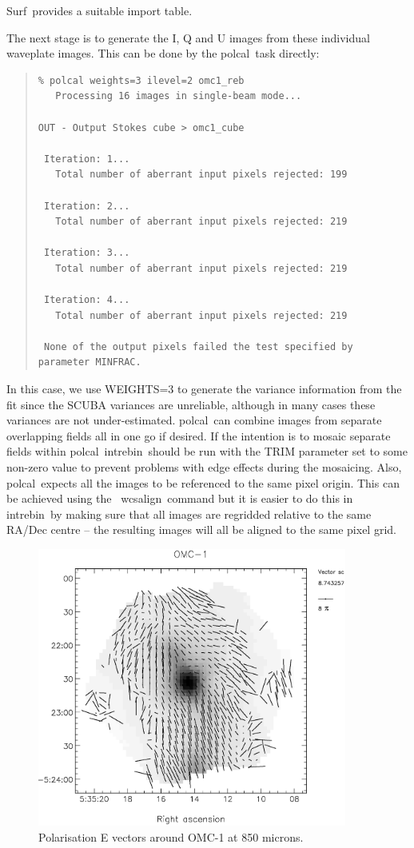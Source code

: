 \documentclass[twoside,11pt]{article}
\newcommand{\scusoft}          {{\sc Surf}}
\newcommand{\Kappa}{\xref{{\sc{Kappa}}}{sun95}{}}
\newcommand{\task}[1]{{\sf #1}}
\newcommand{\intrebin}{\htmlref{\task{intrebin}}{INTREBIN}}
\newcommand{\wcsalign}{\xref{\task{wcsalign}}{sun95}{WCSALIGN}}
\newcommand{\polcal}{\xref{\task{polcal}}{sun223}{POLCAL}}
\newenvironment{myquote}{\begin{quote}\begin{small}}{\end{small}\end{quote}}
\newcommand{\htmlref}[2]{#1}
\newcommand{\xref}[3]{#1}
\renewcommand{\_}{\texttt{\symbol{95}}}
\begin{document}
\scusoft\ provides a suitable import table.

The next stage is to generate the I, Q and U images from these individual
waveplate images. This can be done by the \polcal\ task directly:

\begin{myquote}
\begin{verbatim}
% polcal weights=3 ilevel=2 omc1_reb
   Processing 16 images in single-beam mode...

OUT - Output Stokes cube > omc1_cube

 Iteration: 1...
   Total number of aberrant input pixels rejected: 199

 Iteration: 2...
   Total number of aberrant input pixels rejected: 219

 Iteration: 3...
   Total number of aberrant input pixels rejected: 219

 Iteration: 4...
   Total number of aberrant input pixels rejected: 219

 None of the output pixels failed the test specified by parameter MINFRAC.
\end{verbatim}
\end{myquote}


In this case, we use WEIGHTS=3 to generate the variance information
from the fit since the SCUBA variances are unreliable, although in many
cases these variances are not under-estimated.
\polcal\ can combine images from separate overlapping fields all in one go
if desired. If the intention is to mosaic separate fields within \polcal\
\intrebin\ should be run with the TRIM parameter set to some non-zero
value to prevent problems with edge effects during the mosaicing. Also,
\polcal\ expects all the images to be referenced to the same pixel origin.
This can be achieved using the \Kappa\ \wcsalign\ command but it is easier
to do this in \intrebin\ by making sure that all images are regridded
relative to the same RA/Dec centre -- the resulting images will all
be aligned to the same pixel grid.

\begin{figure}[t]
\begin{center}
\includegraphics[width=4in]{sun216_omc1vec.eps}
\caption{Polarisation E vectors around OMC-1 at 850 microns.}
\label{omc1_vectors}
\end{center}
\end{figure}
\end{document}
